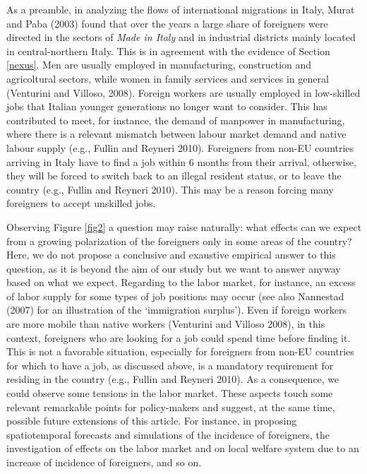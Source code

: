 \documentclass[10pt]{article}
\theoremstyle{definition}
\theoremstyle{plain}
\begin{document}
As a preamble, in analyzing the flows of international migrations in Italy, Murat and Paba (2003) found that over the years a large share of foreigners were directed in the sectors of \textsl{Made in Italy} and in industrial districts mainly located in central-northern Italy. This is in agreement with the evidence of Section \ref{nexus}. Men are usually employed in manufacturing, construction and agricoltural sectors, while women in family services and services in general (Venturini and Villoso, 2008). Foreign workers are usually employed in low-skilled jobs that Italian younger generations no longer want to consider. This has contributed to meet, for instance, the demand of manpower in manufacturing, where there is a relevant mismatch between labour market demand and native labour supply (e.g., Fullin and Reyneri 2010). Foreigners from non-EU countries arriving in Italy have to find a job within 6 months from their arrival, otherwise, they will be forced to switch back to an illegal resident status, or to leave the country (e.g., Fullin and Reyneri 2010). This may be a reason forcing many foreigners to accept unskilled jobs.

Observing Figure \ref{fig2} a question may raise naturally: what effects can we expect from a growing polarization of the foreigners only in some areas of the country? Here, we do not propose a conclusive and exaustive empirical answer to this question, as it is beyond the aim of our study but we want to answer anyway based on what we expect. Regarding to the labor market, for instance, an excess of labor supply for some types of job positions may occur (see also Nannestad (2007) for an illustration of the `immigration surplus'). Even if foreign workers are more mobile than native workers (Venturini and Villoso 2008), in this context, foreigners who are looking for a job could spend time before finding it. This is not a favorable situation, especially for foreigners from non-EU countries for which to have a job, as discussed above, is a mandatory requirement for residing in the country (e.g., Fullin and Reyneri 2010). As a consequence, we could observe some tensions in the labor market. These aspects touch some relevant remarkable points for policy-makers and suggest, at the same time, possible future  extensions of this article. For instance, in proposing spatiotemporal forecasts and simulations of the incidence of foreigners, the investigation of effects on the labor market and on local welfare system due to an increase of incidence of foreigners, and so on.
\end{document}

